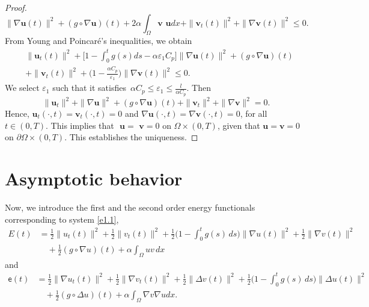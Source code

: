 \documentclass[11pt]{article}
\numberwithin{equation}{section}
\begin{document}
\begin{proof}
\[ \| \nabla \mathbf{u}(t) \|^2 +(g\circ \nabla \mathbf{u})(t)
 +2 \alpha \int_\Omega \mathbf{v}\textbf{ u}dx
 +\| \mathbf{v}_{t} (t)\|^2 + \| \nabla \mathbf{v}(t) \|^2 \leq 0.
\]
 From Young and Poincar\'e's inequalities, we obtain
\begin{align*}
&\| \mathbf{u}_{t}(t) \| ^2+ \Big[ 1-\int_0^t g(s) ds
 -\alpha \varepsilon_{1} C_p \Big] \| \nabla \mathbf{u}(t) \|^2
 +(g\circ \nabla \mathbf{u})(t)\\
&+\| \mathbf{v}_{t}(t) \|^2 + \Big( 1-\frac{\alpha C_{p}}{\varepsilon_{1} }\Big)
\| \nabla \mathbf{v}(t) \|^2 \leq 0.
\end{align*}
We select $\varepsilon_{1}$ such that it satisfies\,
$\alpha C_p \leq \varepsilon_{1}\leq \frac{l}{\alpha C_p}$. Then
\[
 \| \mathbf{u}_{t} \|^2 + \| \nabla \mathbf{u} \|^2
 +(g\circ\nabla \mathbf{u})(t)+\| \mathbf{v}_{t} \|^2 + \| \nabla \mathbf{v} \|^2=0.
\]
Hence, \( \mathbf{u}_t(\cdot, t) = \mathbf{v}_t(\cdot, t) = 0 \) and
\( \nabla \mathbf{u}(\cdot, t) = \nabla\mathbf{v}(\cdot, t) = 0 \), for all
\( t \in (0, T) \). This implies that \( \textbf{ u} = \textbf{ v} = 0 \) on
\( \Omega \times (0, T) \), given that \( \mathbf{u} = \mathbf{v} = 0 \) on
\( \partial\Omega \times (0, T) \). This establishes the uniqueness.
\end{proof}

\section{Asymptotic behavior}

Now, we introduce the first and the second order energy functionals corresponding
to system \eqref{e1.1},
\begin{equation}
\begin{aligned}
E(t) &= \frac{1}{2} \| u_t(t) \|^2 + \frac{1}{2} \| v_t(t) \|^2
 + \frac{1}{2} \Big(1 - \int_0^t g(s) \, ds \Big) \| \nabla u(t) \|^2
 + \frac{1}{2} \| \nabla v(t) \|^2 \\
&\quad + \frac{1}{2} (g \circ \nabla u)(t) + \alpha \int_{\Omega} u v \, dx\label{e4.1}
\end{aligned}
\end{equation}
and
\begin{equation}
\begin{aligned}
 \mathsf{e}(t)
& = \frac{1}{2}\| \nabla u_t(t) \|^2+\frac{1}{2}\| \nabla v_t(t) \|^2
 +\frac{1}{2} \| \Delta v(t) \|^2
 + \frac{1}{2}\Big(1 - \int_0^t g(s) \, ds \Big) \| \Delta u(t) \|^2\\
&\quad + \frac{1}{2}(g \circ \Delta u)(t)
 + \alpha \int_{\Omega}\nabla v \nabla u dx.
\end{aligned}\label{e4.2}
\end{equation}
\end{document}
